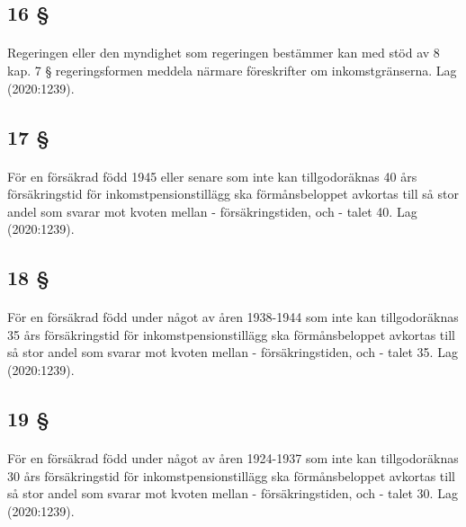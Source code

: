 \documentclass[a4paper,notitlepage,openany,10pt]{book}
\begin{document}
\subsection*{16 §}
\paragraph*{}
Regeringen eller den myndighet som regeringen bestämmer kan med stöd av 8 kap. 7 § regeringsformen meddela närmare föreskrifter om inkomstgränserna.
Lag (2020:1239).
\subsection*{17 §}
\paragraph*{}
För en försäkrad född 1945 eller senare som inte kan tillgodoräknas 40 års försäkringstid för inkomstpensionstillägg ska förmånsbeloppet avkortas till så stor andel som svarar mot kvoten mellan
\newline - försäkringstiden, och
\newline - talet 40.
Lag (2020:1239).
\subsection*{18 §}
\paragraph*{}
För en försäkrad född under något av åren 1938-1944 som inte kan tillgodoräknas 35 års försäkringstid för inkomstpensionstillägg ska förmånsbeloppet avkortas till så stor andel som svarar mot kvoten mellan
\newline - försäkringstiden, och
\newline - talet 35.
Lag (2020:1239).
\subsection*{19 §}
\paragraph*{}
För en försäkrad född under något av åren 1924-1937 som inte kan tillgodoräknas 30 års försäkringstid för inkomstpensionstillägg ska förmånsbeloppet avkortas till så stor andel som svarar mot kvoten mellan
\newline - försäkringstiden, och
\newline - talet 30.
Lag (2020:1239).
\end{document}
